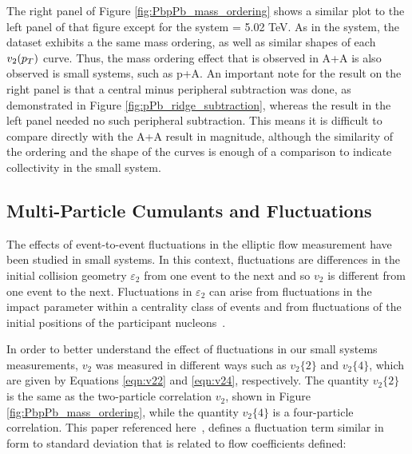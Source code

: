 The right panel of Figure \ref{fig:PbpPb_mass_ordering} shows a similar plot to the left panel of that figure except for the system \ppb \sqsn = 5.02 TeV. As in the \pbpb system, the \ppb dataset exhibits a the same mass ordering, as well as similar shapes of each $v_2(\mbox{$p_T$})$ curve. Thus, the mass ordering effect that is observed in A+A is also observed is small systems, such as p+A. An important note for the result on the right panel is that a central minus peripheral subtraction was done, as demonstrated in Figure \ref{fig:pPb_ridge_subtraction}, whereas the result in the left panel needed no such peripheral subtraction. This means it is difficult to compare directly with the A+A result in magnitude, although the similarity of the ordering and the shape of the curves is enough of a comparison to indicate collectivity in the small system.


\subsection{Multi-Particle Cumulants and Fluctuations}
\label{sec:cumulants_fluctua}
The effects of event-to-event fluctuations in the elliptic flow measurement have been studied in small systems. In this context, fluctuations are differences in the initial collision geometry $\varepsilon_2$ from one event to the next and so $v_2$ is different from one event to the next. Fluctuations in $\varepsilon_2$ can arise from fluctuations in the impact parameter within a centrality class of events and from fluctuations of the initial positions of the participant nucleons~\cite{PhysRevC.80.014904}.

In order to better understand the effect of fluctuations in our small systems measurements, $v_2$ was measured in different ways such as $v_2\{2\}$ and $v_2\{4\}$, which are given by Equations \ref{eqn:v22} and \ref{eqn:v24}, respectively. The quantity $v_2\{2\}$ is the same as the two-particle correlation $v_2$, shown in Figure \ref{fig:PbpPb_mass_ordering}, while the quantity $v_2\{4\}$ is a four-particle correlation. This paper referenced here~\cite{PhysRevC.80.014904}, defines a fluctuation term similar in form to standard deviation that is related to flow coefficients defined:

